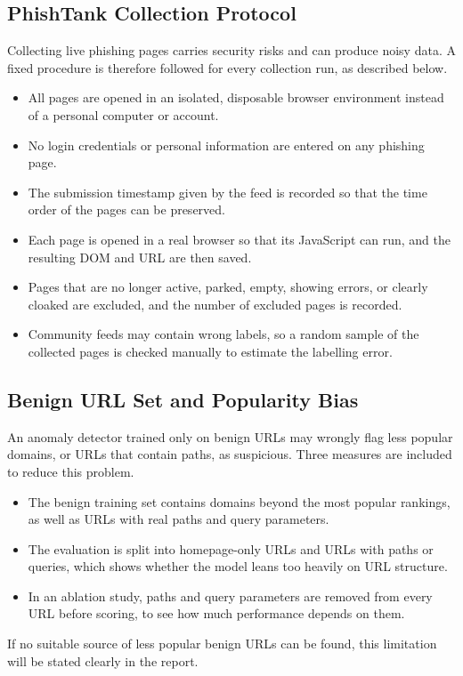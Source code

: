\documentclass{FastFyp}
\begin{document}
\subsection{PhishTank Collection Protocol}
Collecting live phishing pages carries security risks and can produce noisy data. A fixed procedure is therefore followed for every collection run, as described below.
\begin{itemize}
    \item All pages are opened in an isolated, disposable browser environment instead of a personal computer or account.
    \item No login credentials or personal information are entered on any phishing page.
    \item The submission timestamp given by the feed is recorded so that the time order of the pages can be preserved.
    \item Each page is opened in a real browser so that its JavaScript can run, and the resulting DOM and URL are then saved.
    \item Pages that are no longer active, parked, empty, showing errors, or clearly cloaked are excluded, and the number of excluded pages is recorded.
    \item Community feeds may contain wrong labels, so a random sample of the collected pages is checked manually to estimate the labelling error.
\end{itemize}

\subsection{Benign URL Set and Popularity Bias}
An anomaly detector trained only on benign URLs may wrongly flag less popular domains, or URLs that contain paths, as suspicious. Three measures are included to reduce this problem.
\begin{itemize}
    \item The benign training set contains domains beyond the most popular rankings, as well as URLs with real paths and query parameters.
    \item The evaluation is split into homepage-only URLs and URLs with paths or queries, which shows whether the model leans too heavily on URL structure.
    \item In an ablation study, paths and query parameters are removed from every URL before scoring, to see how much performance depends on them.
\end{itemize}
If no suitable source of less popular benign URLs can be found, this limitation will be stated clearly in the report.
\end{document}
